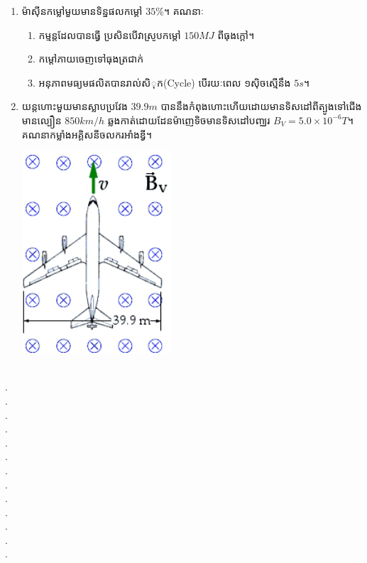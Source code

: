 \documentclass{officialexam}
\begin{document}
\begin{enumerate}[I]
	\item ម៉ាសុីនកម្លៅមួយមានទិន្នផលកម្តៅ $35\%$។ គណនាៈ
	\begin{enumerate}[k]
		\item កម្មន្តដែលបានធ្វើ ប្រសិនបើវាស្រូបកម្តៅ $150MJ$ ពីធុងក្តៅ។
		\item កម្តៅភាយចេញទៅធុងត្រជាក់
		\item អនុភាពមធ្យមផលិតបានរាល់សិុក{\en (Cycle)} បើរយៈពេល ១សុិចស្មើនឹង $5s$។
	\end{enumerate}
	\item យន្តហោះមួយមានស្លាបប្រវែង $39.9m$ បាននឹងកំពុងហោះហើយដោយមានទិសដៅពីត្បូងទៅជើងមានល្បឿន $850km/h$ ឆ្លងកាត់ដោយដែនម៉ាញេទិចមានទិសដៅបញ្ឈរ $B_V=5.0\times10^{-6}T$។ គណនាកម្លាំងអគ្គិសនីចលករអាំងឌ្វី។
	\begin{center}
		\includegraphics[scale=0.6]{image8}
	\end{center}
	\end{enumerate}
\\
{\color{white}.}\dotfill\\
{\color{white}.}\dotfill\\
{\color{white}.}\dotfill
\\
{\color{white}.}\dotfill\\
{\color{white}.}\dotfill\\
{\color{white}.}\dotfill
\\
{\color{white}.}\dotfill\\
{\color{white}.}\dotfill\\
{\color{white}.}\dotfill
\\
{\color{white}.}\dotfill\\
{\color{white}.}\dotfill\\
{\color{white}.}\dotfill
\\
{\color{white}.}\dotfill\\
\end{document}
